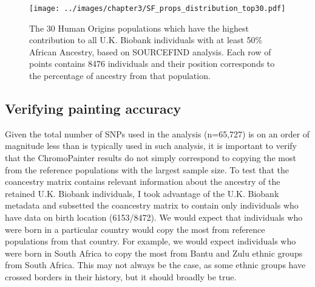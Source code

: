 \begin{figure}[htp]
    \centering
    \texttt{[image: ../images/chapter3/SF\_props\_distribution\_top30.pdf]}
    \caption{The 30 Human Origins populations which have the highest contribution to all U.K. Biobank individuals with at least 50\% African Ancestry, based on SOURCEFIND analysis. Each row of points contains 8476 individuals and their position corresponds to the percentage of ancestry from that population. }
    \label{fig:SF_props_distribution_top30}
\end{figure}

\subsection{Verifying painting accuracy}

Given the total number of SNPs used in the analysis (n=65,727) is on an order of magnitude less than is typically used in such analysis, it is important to verify that the ChromoPainter results do not simply correspond to copying the most from the reference populations with the largest sample size. To test that the coancestry matrix contains relevant information about the ancestry of the retained U.K. Biobank individuals, I took advantage of the U.K. Biobank metadata and subsetted the coancestry matrix to contain only individuals who have data on birth location (6153/8472). We would expect that individuals who were born in a particular country would copy the most from reference populations from that country. For example, we would expect individuals who were born in South Africa to copy the most from Bantu and Zulu ethnic groups from South Africa. This may not always be the case, as some ethnic groups have crossed borders in their history, but it should broadly be true. 

